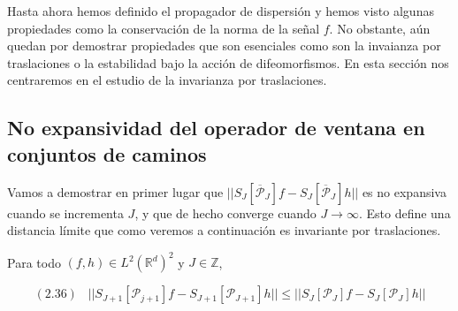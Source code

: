 \noindent Hasta ahora hemos definido el propagador de dispersión y hemos visto algunas propiedades como la conservación de la norma de la señal $f$. No obstante, aún quedan por demostrar propiedades que son esenciales como son la invaianza por traslaciones o la estabilidad bajo la acción de difeomorfismos. En esta sección nos centraremos en el estudio de la invarianza por traslaciones.

\subsection{No expansividad del operador de ventana en conjuntos de caminos}
Vamos a demostrar en primer lugar que $||S_J[\overline{\mathcal{P}}_J] f- S_J[\overline{\mathcal{P}}_J] h ||$ es no expansiva cuando se incrementa $J$, y que de hecho converge cuando $J \rightarrow \infty$. Esto define una distancia límite que como veremos a continuación es invariante por traslaciones.

\medskip

\begin{proposicion}
\noindent Para todo $(f,h) \in L^2(\mathbb{R}^d)^2$ y $J\in \mathbb{Z}$, 

$$(2.36) \;\;\; || S_{J+1} [\mathcal{P}_{j+1}]f- S_{J+1}[\mathcal{P}_{J+1}]h || \leq ||S_J[\mathcal{P}_J]f - S_J[\mathcal{P}_J]h ||$$
\end{proposicion}

